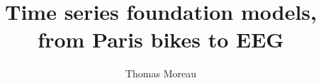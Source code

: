 \documentclass[aspectratio=169]{beamer}
\title[Time series foundation models · NeurIPS Paris 2026]{Time series foundation models,\\from Paris bikes to EEG}
\author{Thomas Moreau}
\institute{Inria, MIND team}
\begin{document}
\begin{frame}[plain]
  \titlepage
\end{frame}




\end{document}
